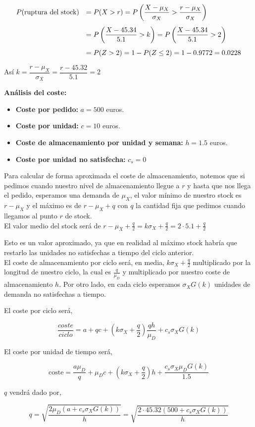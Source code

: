\documentclass[a4paper,12pt]{article}
\begin{document}
\begin{equation*}
\begin{array}{l l}
 P(\text{ruptura del stock}) & =  P(X > r) = P\left(\dfrac{X - \mu_X}{\sigma_X} > \dfrac{r-\mu_X}{\sigma_X}\right) \\[0.5cm]
 \, &   = P\left(\dfrac{X - 45.34}{5.1} > k\right) = P\left(\dfrac{X - 45.34}{5.1} > 2\right) \\[0.5cm]
 \, &   = P(Z > 2) = 1 - P(Z \leq 2) = 1 - 0.9772 =  0.0228
\end{array}
\end{equation*}


As\'i $k = \dfrac{r - \mu_X}{\sigma_X} = \dfrac{r - 45.32}{5.1} = 2$

\pagebreak



\textbf{An\'alisis del coste:} 

\begin{itemize}
\item[] \textbf{Coste por pedido:} $a = 500$ euros.
\item[] \textbf{Coste por unidad:} $c = 10$ euros.
\item[] \textbf{Coste de almacenamiento por unidad y semana:} $h = 1.5$ euros.

\item[] \textbf{Coste por unidad no satisfecha:} $c_s = 0$
\end{itemize}

Para calcular de forma aproximada el coste de almacenamiento, notemos que si pedimos cuando nuestro nivel de almacenamiento llegue a $r$ y hasta que nos llega el pedido, esperamos una demanda de $\mu_X$, el valor m\'inimo de nuestro stock es $r - \mu_X$ y el m\'aximo es de $r - \mu_X + q$ con $q$ la cantidad fija que pedimos cuando llegamos al punto $r$ de stock. \\

El valor medio del stock ser\'a de $r - \mu_X + \frac{q}{2} = k\sigma_X + \frac{q}{2} = 2\cdot 5.1 + \frac{q}{2} $

Esto es un valor aproximado, ya que en realidad al m\'aximo stock habr\'ia que restarlo las unidades no satisfechas a tiempo del ciclo anterior. \\


El coste de almacenamiento por ciclo ser\'a, en media, $k \sigma_X + \frac{q}{2}$ multiplicado por la longitud de nuestro ciclo, la cual es  
$\frac{q}{\mu_D}$ y multiplicado por nuestro coste de almacenamiento $h$. Por otro lado, en cada ciclo esperamos $\sigma_X G(k)$ unidades de demanda no satisfechas a tiempo.

El coste por ciclo ser\'a,

$$ \frac{coste}{ciclo} = a + qc + (k \sigma_X  + \frac{q}{2})\frac{qh}{\mu_D} + c_s\sigma_XG(k)$$

El coste por unidad de tiempo ser\'a,

$$ \text{coste} = \frac{a\mu_D}{q} + \mu_D c + (k\sigma_X + \frac{q}{2}) h + \frac{c_s\sigma_X \mu_D G(k)}{1.5}$$

$q$ vendr\'a dado por,

$$ q = \sqrt{\frac{2\mu_D (a + c_s \sigma_X G(k))}{h}} = \sqrt{\frac{2\cdot 45.32(500 + c_s\sigma_X G(k))}{h}}$$
     
\end{document}
